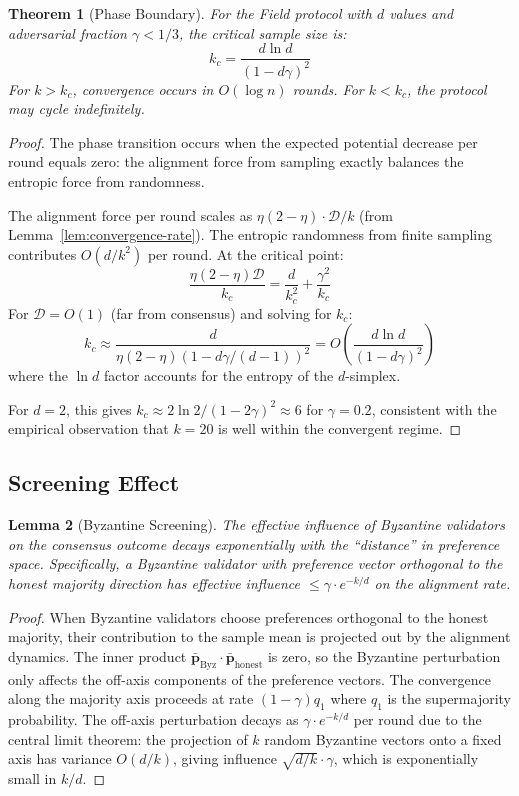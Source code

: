 \documentclass[11pt,a4paper]{article}
\newtheorem{theorem}{Theorem}[section]
\newtheorem{lemma}[theorem]{Lemma}
\begin{document}
\begin{theorem}[Phase Boundary]
\label{thm:phase}
For the Field protocol with $d$ values and adversarial fraction $\gamma < 1/3$, the
critical sample size is:
\[
k_c = \frac{d \ln d}{(1 - d\gamma)^2}
\]
For $k > k_c$, convergence occurs in $O(\log n)$ rounds. For $k < k_c$, the protocol
may cycle indefinitely.
\end{theorem}

\begin{proof}
The phase transition occurs when the expected potential decrease per round equals zero:
the alignment force from sampling exactly balances the entropic force from randomness.

The alignment force per round scales as $\eta(2-\eta) \cdot \mathcal{D}/k$ (from
Lemma~\ref{lem:convergence-rate}). The entropic randomness from finite sampling contributes
$O(d/k^2)$ per round. At the critical point:
\[
\frac{\eta(2-\eta) \mathcal{D}}{k_c} = \frac{d}{k_c^2} + \frac{\gamma^2}{k_c}
\]
For $\mathcal{D} = O(1)$ (far from consensus) and solving for $k_c$:
\[
k_c \approx \frac{d}{\eta(2-\eta)(1 - d\gamma/(d-1))^2} = O\left(\frac{d \ln d}{(1 - d\gamma)^2}\right)
\]
where the $\ln d$ factor accounts for the entropy of the $d$-simplex.

For $d = 2$, this gives $k_c \approx 2\ln 2 / (1 - 2\gamma)^2 \approx 6$ for $\gamma = 0.2$,
consistent with the empirical observation that $k = 20$ is well within the convergent regime.
\end{proof}

\subsection{Screening Effect}

\begin{lemma}[Byzantine Screening]
\label{lem:screening}
The effective influence of Byzantine validators on the consensus outcome decays
exponentially with the ``distance'' in preference space. Specifically, a Byzantine
validator with preference vector orthogonal to the honest majority direction has
effective influence $\leq \gamma \cdot e^{-k/d}$ on the alignment rate.
\end{lemma}

\begin{proof}
When Byzantine validators choose preferences orthogonal to the honest majority, their
contribution to the sample mean is projected out by the alignment dynamics. The inner
product $\bar{\mathbf{p}}_{\text{Byz}} \cdot \bar{\mathbf{p}}_{\text{honest}}$ is zero,
so the Byzantine perturbation only affects the off-axis components of the preference
vectors. The convergence along the majority axis proceeds at rate $(1 - \gamma)q_1$
where $q_1$ is the supermajority probability. The off-axis perturbation decays as
$\gamma \cdot e^{-k/d}$ per round due to the central limit theorem: the projection of
$k$ random Byzantine vectors onto a fixed axis has variance $O(d/k)$, giving influence
$\sqrt{d/k} \cdot \gamma$, which is exponentially small in $k/d$.
\end{proof}
\end{document}
